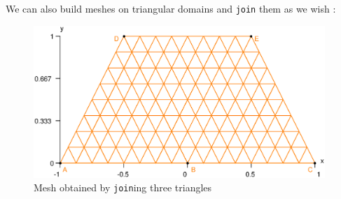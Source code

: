 We can also build meshes on triangular domains and {\small\tt join} them as we wish :

\begin{figure}[ht] \centering
  \includegraphics[width=110mm]{three-tri}
  \caption{Mesh obtained by {\small\tt join}ing three triangles}
  \label{\numb section 1.\numb fig 7}
\end{figure}

